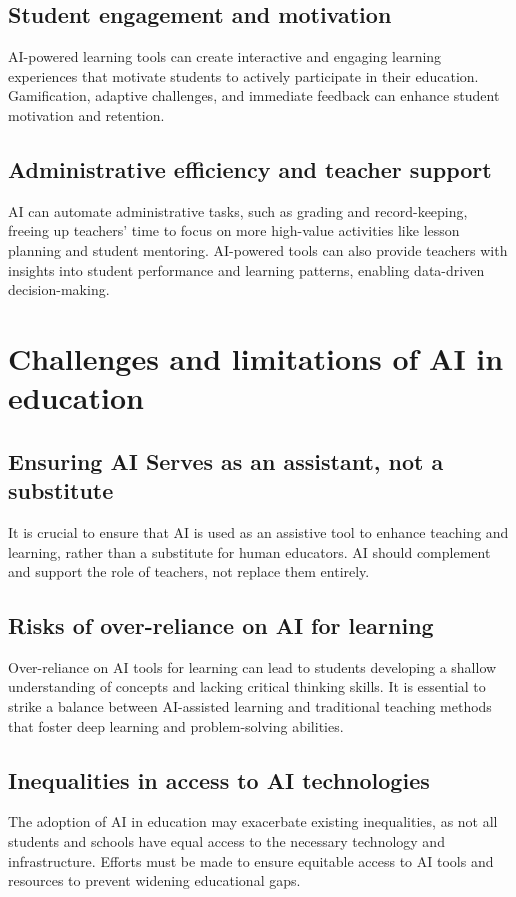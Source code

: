 \documentclass{article}
\begin{document}
\subsection{Student engagement and motivation}
AI-powered learning tools can create interactive and engaging learning experiences that motivate students to actively participate in their education. Gamification, adaptive challenges, and immediate feedback can enhance student motivation and retention.

\subsection{Administrative efficiency and teacher support}
AI can automate administrative tasks, such as grading and record-keeping, freeing up teachers' time to focus on more high-value activities like lesson planning and student mentoring. AI-powered tools can also provide teachers with insights into student performance and learning patterns, enabling data-driven decision-making.

\newpage
\section{Challenges and limitations of AI in education}

\subsection{Ensuring AI Serves as an assistant, not a substitute}
It is crucial to ensure that AI is used as an assistive tool to enhance teaching and learning, rather than a substitute for human educators. AI should complement and support the role of teachers, not replace them entirely.

\subsection{Risks of over-reliance on AI for learning}
Over-reliance on AI tools for learning can lead to students developing a shallow understanding of concepts and lacking critical thinking skills. It is essential to strike a balance between AI-assisted learning and traditional teaching methods that foster deep learning and problem-solving abilities.

\subsection{Inequalities in access to AI technologies}
The adoption of AI in education may exacerbate existing inequalities, as not all students and schools have equal access to the necessary technology and infrastructure. Efforts must be made to ensure equitable access to AI tools and resources to prevent widening educational gaps.
\end{document}
